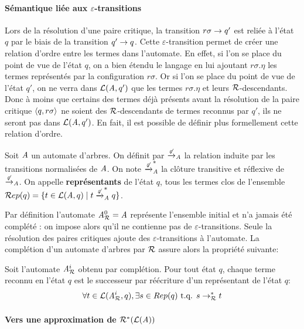 \paragraph{Sémantique liée aux $\varepsilon$-transitions}
Lors de la résolution d'une paire critique, la transition $r\sigma \rightarrow q'$ est reliée à l'état $q$ par le biais de la transition
$q' \rightarrow q$. Cette $\varepsilon$-transition permet de créer une relation d'ordre entre les termes dans l'automate.
En effet, si l'on se place du point de vue de l'état $q$, on a bien étendu le langage en lui ajoutant $r\sigma.\eta$
les termes représentés par la configuration $r\sigma$. Or si l'on se place du point de vue de l'état $q'$, on ne verra dans $\mathcal{L}(\mathit A,q')$
que les termes $r\sigma.\eta$ et leurs $\mathcal R$-descendants. Donc à moins que certains des termes déjà présents avant la résolution
de la paire critique $\langle q, r\sigma\rangle$ ne soient des $\mathcal R$-descendants de termes reconnus par $q'$, ils ne seront pas dans $\mathcal{L}(\mathit A, q')$.
En fait, il est possible de définir plus formellement cette relation d'ordre.
\begin{definition}
  \label{def:representants}
  Soit $\mathit A$ un automate d'arbres. On définit par $\xrightarrow{\not\varepsilon}_\mathit A$ la relation induite par les transitions normalisées de $\mathit A$.
  On note $\xrightarrow{\not\varepsilon}^*_\mathit A$ la clôture transitive et réflexive de $\xrightarrow{\not\varepsilon}_\mathit A$.
  On appelle \textbf{représentants} de l'état $q$, tous les termes clos de l'ensemble $\mathcal R ep(q) = \{t \in \mathcal{L}(\mathit A, q)\; | \; t \xrightarrow{\not\varepsilon}^*_\mathit A q\}$.
\end{definition}

Par définition l'automate ${\mathit A}_{\mathcal R}^0 = \mathit A$ représente l'ensemble initial et n'a jamais été complété : on impose alors qu'il ne contienne pas 
de $\varepsilon$-transitions. Seule la résolution des paires critiques ajoute des $\varepsilon$-transitions à l'automate.
La complétion d'un automate d'arbres par $\mathcal R$ assure alors la propriété suivante:


\begin{property}
  Soit l'automate ${\mathit A}_{\mathcal R}^i$ obtenu par complétion. Pour tout état $q$, 
  chaque terme reconnu en l'état $q$ est le successeur par réécriture d'un représentant 
  de l'état $q$:
  \[\forall t \in \mathcal{L}({\mathit A}_{\mathcal R}^i, q), \exists s \in Rep(q) \mbox{ t.q. } s \rightarrow_\mathcal R^* t\]
\end{property}



\paragraph{Vers une approximation de $\mathcal R^*(\mathcal{L}(\mathit A))$}


